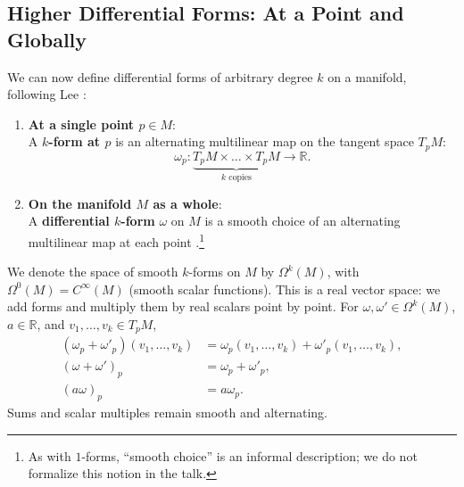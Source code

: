     \subsection{Higher Differential Forms: At a Point and Globally}
    We can now define differential forms of arbitrary degree $k$ on a
    manifold, following Lee \cite[``Differential Forms on Manifolds,''
    pp.~359--360]{lee2013smooth}:
    \begin{enumerate}
        \item \textbf{At a single point $p \in M$}:\\
            A \textbf{$k$-form at $p$} is an alternating multilinear map on
            the tangent space $T_pM$:
            \[
                \omega_p \colon
                \underbrace{T_pM \times \dots \times T_pM}_{k \text{ copies}}
                \to \mathbb{R}.
            \]
        \item \textbf{On the manifold $M$ as a whole}:\\
            A \textbf{differential $k$-form} $\omega$ on $M$ is a smooth
            choice of an alternating multilinear map at each point
            \cite[p.~360]{lee2013smooth}.\footnote{%
                As with $1$-forms, ``smooth choice'' is an informal
                description; we do not formalize this notion in the talk.}
    \end{enumerate}

    We denote the space of smooth $k$-forms on $M$ by $\Omega^k(M)$, with
    $\Omega^0(M) = C^\infty(M)$ (smooth scalar functions).
    This is a real vector space: we add forms and multiply them by real
    scalars point by point. For $\omega,\omega' \in \Omega^k(M)$,
    $a \in \mathbb{R}$, and $v_1,\dots,v_k \in T_pM$,
    \[
        \begin{aligned}
            (\omega_p+\omega'_p)(v_1,\dots,v_k)
                &= \omega_p(v_1,\dots,v_k)+\omega'_p(v_1,\dots,v_k), \\
            (\omega+\omega')_p &= \omega_p+\omega'_p, \\
            (a\omega)_p &= a\omega_p.
        \end{aligned}
    \]
    Sums and scalar multiples remain smooth and alternating.

